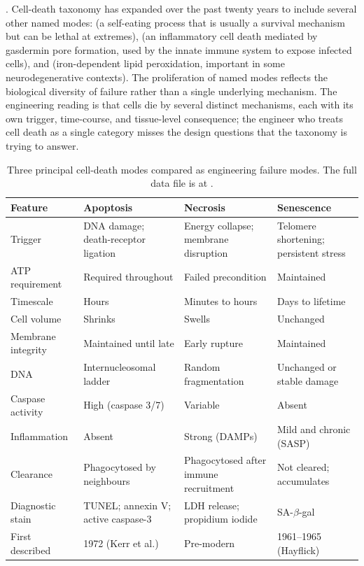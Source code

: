 . Cell-death taxonomy has expanded over the past
twenty years to include several other named modes: 
(a self-eating process that is usually a survival mechanism but can be
lethal at extremes),  (an inflammatory cell death
mediated by gasdermin pore formation, used by the innate immune system
to expose infected cells), and  (iron-dependent
lipid peroxidation, important in some neurodegenerative contexts). The
proliferation of named modes reflects the biological diversity of
failure rather than a single underlying mechanism. The engineering
reading is that cells die by several distinct mechanisms, each with
its own trigger, time-course, and tissue-level consequence; the
engineer who treats cell death as a single category misses the design
questions that the taxonomy is trying to answer.

\begin{table}[htbp]
\centering
\caption[Three principal cell-death modes compared]{Three principal
cell-death modes compared as engineering failure modes. The full data
file is at
.}
\label{tab:vol06:ch01:death-modes}
\begin{tabular}{p{3.0cm} p{3.7cm} p{3.7cm} p{3.7cm}}
\hline
\textbf{Feature} & \textbf{Apoptosis} & \textbf{Necrosis} &
  \textbf{Senescence} \\
\hline
Trigger & DNA damage; death-receptor ligation &
  Energy collapse; membrane disruption &
  Telomere shortening; persistent stress \\
ATP requirement & Required throughout & Failed precondition &
  Maintained \\
Timescale & Hours & Minutes to hours & Days to lifetime \\
Cell volume & Shrinks & Swells & Unchanged \\
Membrane integrity & Maintained until late &
  Early rupture & Maintained \\
DNA & Internucleosomal ladder &
  Random fragmentation & Unchanged or stable damage \\
Caspase activity & High (caspase 3/7) & Variable & Absent \\
Inflammation & Absent & Strong (DAMPs) & Mild and chronic (SASP) \\
Clearance & Phagocytosed by neighbours &
  Phagocytosed after immune recruitment &
  Not cleared; accumulates \\
Diagnostic stain & TUNEL; annexin V; active caspase-3 &
  LDH release; propidium iodide & SA-$\beta$-gal \\
First described & 1972 (Kerr et al.) & Pre-modern &
  1961--1965 (Hayflick) \\
\hline
\end{tabular}
\end{table}


